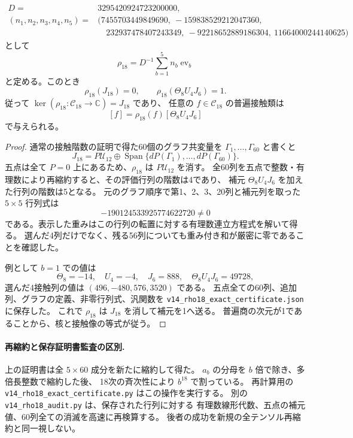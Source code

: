 \begin{proposition}[18次商の五点汎関数]
\label{prop:v14-rho-eighteenth}
\begin{align*}
 D={}&3295420924723200000,\\
 (n_1,n_2,n_3,n_4,n_5)={}&
 (7455703449849690,\ -159838529212047360,\\
 &\hspace{1em}232937478407243349,\ -92218652889186304,\
 11664000244140625)
\end{align*}
として
\[
 \rho_{18}=D^{-1}\sum_{b=1}^{5}n_b\operatorname{ev}_b
\]
と定める。このとき
\[
 \rho_{18}(J_{18})=0,\qquad
 \rho_{18}(\Theta_8U_4J_6)=1.
\]
従って $\ker(\rho_{18}:\mathcal C_{18}\to\mathbb C)=J_{18}$ であり、
任意の $f\in\mathcal C_{18}$ の普遍接触類は
\[
 [f]=\rho_{18}(f)[\Theta_8U_4J_6]
\]
で与えられる。
\end{proposition}

\begin{proof}
通常の接触階数の証明で得た60個のグラフ共変量を
$\Gamma_1,\ldots,\Gamma_{60}$ と書くと
\[
 J_{18}=P\mathcal U_{12}\oplus
        \operatorname{Span}\{dP(\Gamma_1),\ldots,dP(\Gamma_{60})\}.
\]
五点は全て $P=0$ 上にあるため、$\rho_{18}$ は $P\mathcal U_{12}$ を消す。
全60列を五点で整数・有理数により再縮約すると、その評価行列の階数は4であり、
補元 $\Theta_8U_4J_6$ を加えた行列の階数は5となる。
元のグラフ順序で第1、2、3、20列と補元列を取った $5\times5$ 行列式は
\[
 -190124533925774622720\ne0
\]
である。表示した重みはこの行列の転置に対する有理数連立方程式を解いて得る。
選んだ4列だけでなく、残る56列についても重み付き和が厳密に零であることを確認した。

例として $b=1$ での値は
\[
 \Theta_8=-14,\quad U_4=-4,\quad J_6=888,\quad
 \Theta_8U_4J_6=49728,
\]
選んだ4接触列の値は $(496,-480,576,3520)$ である。
五点全ての60列、追加列、グラフの定義、非零行列式、汎関数を
\texttt{v14\_rho18\_exact\_certificate.json} に保存した。
これで $\rho_{18}$ は $J_{18}$ を消して補元を1へ送る。
普遍商の次元が1であることから、核と接触像の等式が従う。
\end{proof}

\paragraph{再縮約と保存証明書監査の区別.}
上の証明書は全 $5\times60$ 成分を新たに縮約して得た。
$a_b$ の分母を $b$ 倍で除き、多倍長整数で縮約した後、
18次の斉次性により $b^{18}$ で割っている。
再計算用の \texttt{v14\_rho18\_exact\_certificate.py} はこの操作を実行する。
別の \texttt{v14\_rho18\_audit.py} は、保存された行列に対する
有理数線形代数、五点の補元値、60列全ての消滅を高速に再検算する。
後者の成功を新規の全テンソル再縮約と同一視しない。

